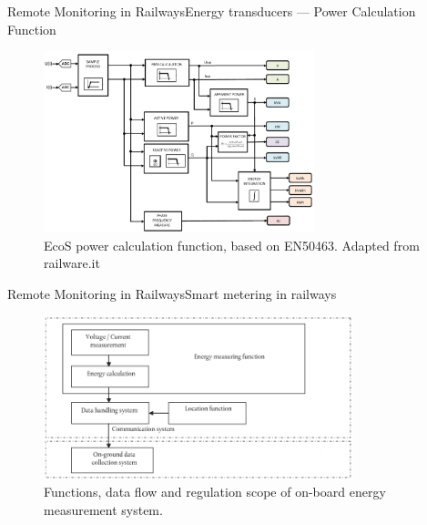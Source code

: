 
\begin{frame}{Remote Monitoring in Railways}{Energy transducers --- Power Calculation Function}


\begin{figure}[h!]
	\centering
	\includegraphics[width=0.7\textwidth,keepaspectratio]{figures/32.EnergyS/energy_calculation}
	\caption{EcoS power calculation function, based on EN50463. Adapted from railware.it}
\end{figure}
	
	
\end{frame}

\begin{frame}{Remote Monitoring in Railways}{Smart metering in railways}

\begin{figure}[h!]
	\centering
	\includegraphics[width=0.8\textwidth,keepaspectratio]{figures/34.SmartM/EMS}
	\caption{Functions, data flow and regulation scope of on-board energy measurement system.}
\end{figure}

\end{frame}

